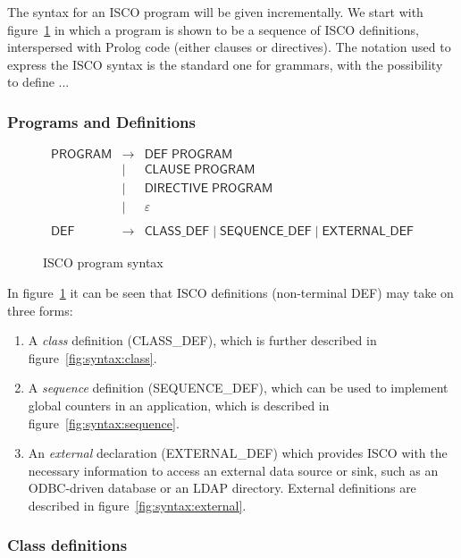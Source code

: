 The syntax for an ISCO program will be given incrementally.  We start with
figure~\ref{fig:syntax:program} in which a program is shown to be a sequence
of ISCO definitions, interspersed with Prolog code (either clauses or
directives).  The notation used to express the ISCO syntax is the standard one
for grammars, with the possibility to define ...


\subsubsection{Programs and Definitions}
\label{sec:syntax:programs-definitions}

\begin{figure}[htb]
  \centering
  \begin{eqnarray*}
    \mathsf{PROGRAM} & \rightarrow & \mathsf{DEF} \; \mathsf{PROGRAM} \\
    & | & \mathsf{CLAUSE} \; \mathsf{PROGRAM} \\
    & | & \mathsf{DIRECTIVE} \; \mathsf{PROGRAM} \\
    & | & \varepsilon \\
    \\
    \mathsf{DEF} & \rightarrow & \mathsf{CLASS\_DEF} \;|\;
    \mathsf{SEQUENCE\_DEF} \;|\; \mathsf{EXTERNAL\_DEF}
  \end{eqnarray*}
  \caption{ISCO program syntax}
  \label{fig:syntax:program}
\end{figure}
In figure~\ref{fig:syntax:program} it can be seen that ISCO definitions
(non-terminal \textsf{DEF}) may take on three forms:
\begin{enumerate}
\item A \emph{class} definition (\textsf{CLASS\_DEF}), which is further
  described in figure~\ref{fig:syntax:class}.
\item A \emph{sequence} definition (\textsf{SEQUENCE\_DEF}), which can be used
  to implement global counters in an application, which is described in
  figure~\ref{fig:syntax:sequence}.
\item An \emph{external} declaration (\textsf{EXTERNAL\_DEF}) which provides
  ISCO with the necessary information to access an external data source or
  sink, such as an ODBC-driven database or an LDAP directory.  External
  definitions are described in figure~\ref{fig:syntax:external}.
\end{enumerate}

\subsubsection{Class definitions}
\label{sec:syntax:class-definitions}

